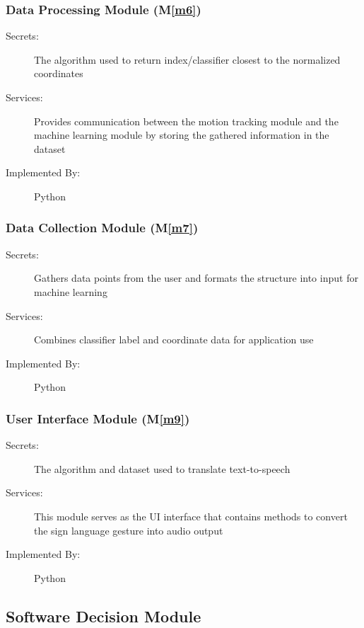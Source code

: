 \documentclass[12pt, titlepage]{article}
\newcommand{\mref}[1]{M\ref{#1}}
\begin{document}
\subsubsection{Data Processing Module (\mref{m6})}

\begin{description}
  \item[Secrets:] The algorithm used to return index/classifier closest to the normalized coordinates
  \item[Services:] Provides communication between the motion tracking module and the machine learning module by storing the gathered information in the dataset
  \item[Implemented By:] Python
  \end{description}

\subsubsection{Data Collection Module (\mref{m7})}

\begin{description}
  \item[Secrets:] Gathers data points from the user and formats the structure into input for machine learning
  \item[Services:] Combines classifier label and coordinate data for application use
  \item[Implemented By:] Python
  \end{description}

\subsubsection{User Interface Module (\mref{m9})}

\begin{description}
  \item[Secrets:] The algorithm and dataset used to translate text-to-speech
  \item[Services:] This module serves as the UI interface that contains methods to convert the sign language gesture into audio output
  \item[Implemented By:] Python
  \end{description}  
  


\subsection{Software Decision Module}
\end{document}
